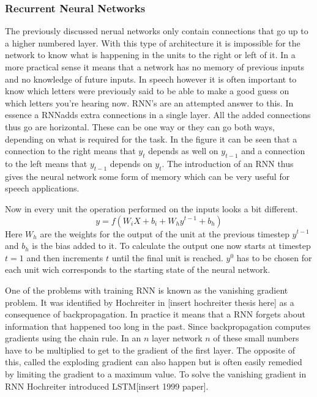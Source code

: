 \documentclass[a4paper]{article}
\begin{document}
\subsubsection{Recurrent Neural Networks}
The previously discussed nerual networks only contain connections that go up to a higher numbered layer. With this type of architecture it is impossible for the network to know what is happening in the units to the right or left of it. In a more practical sense it means that a network has no memory of previous inputs and no knowledge of future inputs. In speech however it is often important to know which letters were previously said to be able to make a good guess on which letters you're hearing now. RNN's are an attempted answer to this. In essence a RNNadds extra connections in a single layer. All the added connections thus go are horizontal. These can be one way or they can go both ways, depending on what is required for the task. In the figure it can be seen that a connection to the right means that $y_t$ depends as well on $y_{t-1}$ and a connection to the left means that $y_{t-1}$ depends on $y_{t}$. The introduction of an RNN thus gives the neural network some form of memory which can be very useful for speech applications.

Now in every unit the operation performed on the inputs looks a bit different.
\begin{equation}
y = \mathit{f}(W_iX + b_i + W_hy^{t-1} + b_h)
\end{equation}
Here $W_h$ are the weights for the output of the unit at the previous timestep $y^{t-1}$ and $b_h$ is the bias added to it. To calculate the output one now starts at timestep $t=1$ and then increments $t$ until the final unit is reached. $y^{0}$ has to be chosen for each unit wich corresponds to the starting state of the neural network.


One of the problems with training RNN is known as the vanishing gradient problem. It was identified by Hochreiter in [insert hochreiter thesis here] as a consequence of backpropagation. In practice it means that a RNN forgets about information that happened too long in the past. Since backpropagation computes gradients using the chain rule. In an $n$ layer network $n$ of these small numbers have to be multiplied to get to the gradient of the first layer. The opposite of this, called the exploding gradient can also happen but is often easily remedied by limiting the gradient to a maximum value. To solve the vanishing gradient in RNN Hochreiter introduced LSTM[insert 1999 paper].
\end{document}
